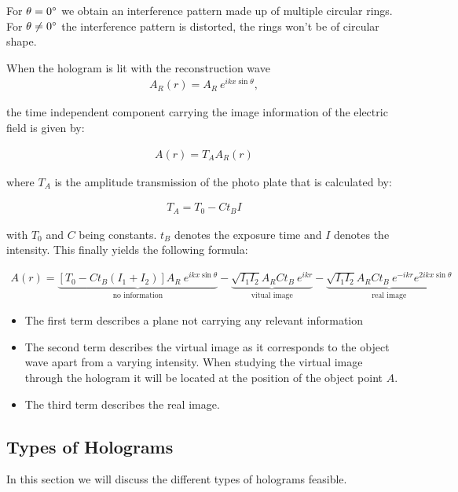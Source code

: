 For $\theta=0^\circ$ we obtain an interference pattern made up of multiple circular rings. For  $\theta\neq0^\circ$ the interference pattern is distorted, the rings won't be of circular shape.



When the hologram is lit with the reconstruction wave
\begin{align}
A_R(r)=A_R\ e^{ikx \sin\theta},
\end{align}


the time independent component carrying the image information of the electric field is given by:


\begin{align}
A(r)=T_AA_R(r)
\end{align}


where $T_A$ is the amplitude transmission of the photo plate that is calculated by:


\begin{align}
T_A=T_0-Ct_BI
\end{align}


with
$T_0$ and $C$ being constants. $t_B$ denotes the exposure time and $I$ denotes the intensity.
This finally yields the following formula:

\begin{align}
A(r)=\underbrace{[T_0-Ct_B(I_1+I_2)]A_R\ e^{ikx \sin\theta}}_{\mbox{no information}} - \underbrace{\sqrt{I_1I_2}A_RCt_B\ e^{ikr}}_{\mbox{vitual image}} - \underbrace{\sqrt{I_1I_2}A_RCt_B\ e^{-ikr}e^{2ikx \sin\theta}}_{\mbox{real image}}
\end{align}



\begin{itemize}
	\item The first term describes a plane not carrying any relevant information
	\item The second term describes the virtual image as it corresponds to the object wave apart from a varying intensity. When studying the virtual image through the hologram it will be located at the position of the object point $A$.
	\item The third term describes the real image.
\end{itemize}

\subsection{Types of Holograms}

In this section we will discuss the different types of holograms feasible.

